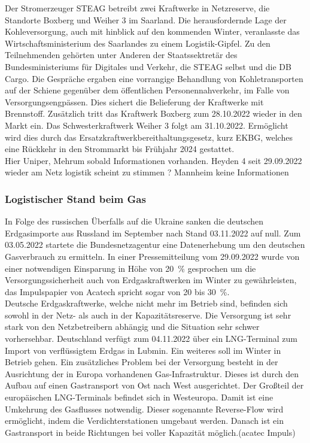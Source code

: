		Der Stromerzeuger STEAG betreibt zwei Kraftwerke in Netzreserve, die Standorte Boxberg und Weiher 3 im Saarland. Die herausfordernde Lage der Kohleversorgung, auch mit hinblick auf den kommenden Winter, veranlasste das Wirtschaftsministerium des Saarlandes zu einem Logistik-Gipfel. Zu den Teilnehmenden gehörten unter Anderen der Staatssektretär des Bundesministeriums für Digitales und Verkehr, die STEAG selbst und die DB Cargo. Die Gespräche ergaben eine vorrangige Behandlung von Kohletransporten auf der Schiene gegenüber dem öffentlichen Personennahverkehr, im Falle von Versorgungsengpässen. Dies sichert die Belieferung der Kraftwerke mit Brennstoff. Zusätzlich tritt das Kraftwerk Boxberg zum 28.10.2022 wieder in den Markt ein. Das Schwesterkraftwerk Weiher 3 folgt am 31.10.2022. Ermöglicht wird dies durch das Ersatzkraftwerkbereithaltungsgesetz, kurz EKBG, welches eine Rückkehr in den Strommarkt bis Frühjahr 2024 gestattet.\\
		
		Hier Uniper, Mehrum sobald Informationen vorhanden.
		Heyden 4 seit 29.09.2022 wieder am Netz logistik scheint zu stimmen ?
		Mannheim keine Informationen
		
		\subsubsection{Logistischer Stand beim Gas}
		In Folge des russischen Überfalls auf die Ukraine sanken die deutschen Erdgasimporte aus Russland im September nach Stand 03.11.2022 auf null. Zum 03.05.2022 startete die Bundesnetzagentur eine Datenerhebung um den deutschen Gasverbrauch zu ermitteln. In einer Pressemitteilung vom 29.09.2022 wurde von einer notwendigen Einsparung in Höhe von \SI{20}{\percent} gesprochen um die Versorgungssicherheit auch von Erdgaskraftwerken im Winter zu gewährleisten, das Impulspapier von Acatech spricht sogar von 20 bis \SI{30}{\percent}.\\
		
		Deutsche Erdgaskraftwerke, welche nicht mehr im Betrieb sind, befinden sich sowohl in der Netz- als auch in der Kapazitätsreserve. Die Versorgung ist sehr stark von den Netzbetreibern abhängig und die Situation sehr schwer vorhersehbar. Deutschland verfügt zum 04.11.2022 über ein LNG-Terminal zum Import von verflüssigtem Erdgas in Lubmin. Ein weiteres soll im Winter in Betrieb gehen.
		Ein zusätzliches Problem bei der Versorgung besteht in der Ausrichtung der in Europa vorhandenen Gas-Infrastruktur. Dieses ist durch den Aufbau auf einen Gastransport von Ost nach West ausgerichtet. Der Großteil der europäischen LNG-Terminals befindet sich in Westeuropa. Damit ist eine Umkehrung des Gasflusses notwendig. Dieser sogenannte Reverse-Flow wird ermöglicht, indem die Verdichterstationen umgebaut werden. Danach ist ein Gastransport in beide Richtungen bei voller Kapazität möglich.(acatec Impuls)\\
		
